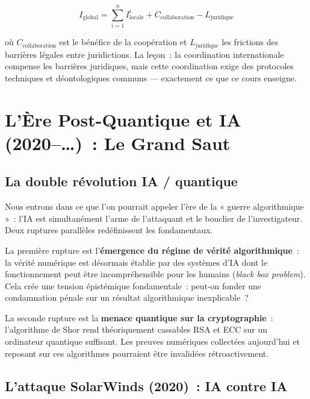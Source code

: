 \begin{equation}
I_{\text{global}} = \sum_{i=1}^{n} I_{\text{locale}}^{i} +
C_{\text{collaboration}} - L_{\text{juridique}}
\label{eq:investigation-globale}
\end{equation}

où $C_{\text{collaboration}}$ est le bénéfice de la coopération et
$L_{\text{juridique}}$ les frictions des barrières légales entre juridictions.
La leçon~: la coordination internationale compense les barrières juridiques,
mais cette coordination exige des protocoles techniques et déontologiques
communs --- exactement ce que ce cours enseigne.

\section{L'Ère Post-Quantique et IA (2020--\ldots)~: Le Grand Saut}

\subsection{La double révolution IA / quantique}

Nous entrons dans ce que l'on pourrait appeler l'ère de la « guerre
algorithmique »~: l'IA est simultanément l'arme de l'attaquant et
le bouclier de l'investigateur. Deux ruptures parallèles redéfinissent
les fondamentaux.

\medskip

La première rupture est l'\textbf{émergence du régime de vérité algorithmique}~:
la vérité numérique est désormais établie par des systèmes d'IA dont le
fonctionnement peut être incompréhensible pour les humains (\textit{black box
problem}). Cela crée une tension épistémique fondamentale~: peut-on fonder
une condamnation pénale sur un résultat algorithmique inexplicable~?

La seconde rupture est la \textbf{menace quantique sur la cryptographie}~:
l'algorithme de Shor rend théoriquement cassables RSA et ECC sur un ordinateur
quantique suffisant. Les preuves numériques collectées aujourd'hui et
reposant sur ces algorithmes pourraient être invalidées rétroactivement.

\subsection{L'attaque SolarWinds (2020)~: IA contre IA}

